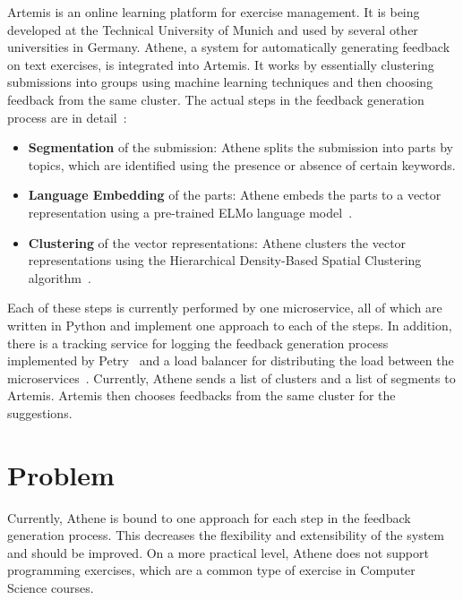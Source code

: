 Artemis is an online learning platform for exercise management. It is being developed at the Technical University of Munich and used by several other universities in Germany. 
Athene, a system for automatically generating feedback on text exercises, is integrated into Artemis. It works by essentially clustering submissions into groups using machine learning techniques and then choosing feedback from the same cluster. The actual steps in the feedback generation process are in detail~\cite{cofee}:
\begin{itemize}
    \item \textbf{Segmentation} of the submission: Athene splits the submission into parts by topics, which are identified using the presence or absence of certain keywords.
    \item \textbf{Language Embedding} of the parts: Athene embeds the parts to a vector representation using a pre-trained ELMo language model~\cite{deepContextualizedWordRepresentations}.
    \item \textbf{Clustering} of the vector representations: Athene clusters the vector representations using the Hierarchical Density-Based Spatial Clustering algorithm~\cite{hdbsc}.
\end{itemize}

Each of these steps is currently performed by one microservice, all of which are written in Python and implement one approach to each of the steps.
In addition, there is a tracking service for logging the feedback generation process implemented by Petry~\cite{atheneTracking} and a load balancer for distributing the load between the microservices~\cite{atheneLoadBalancer}.
Currently, Athene sends a list of clusters and a list of segments to Artemis. Artemis then chooses feedbacks from the same cluster for the suggestions.


\section*{Problem}

Currently, Athene is bound to one approach for each step in the feedback generation process. This decreases the flexibility and extensibility of the system and should be improved.
On a more practical level, Athene does not support programming exercises, which are a common type of exercise in Computer Science courses.

